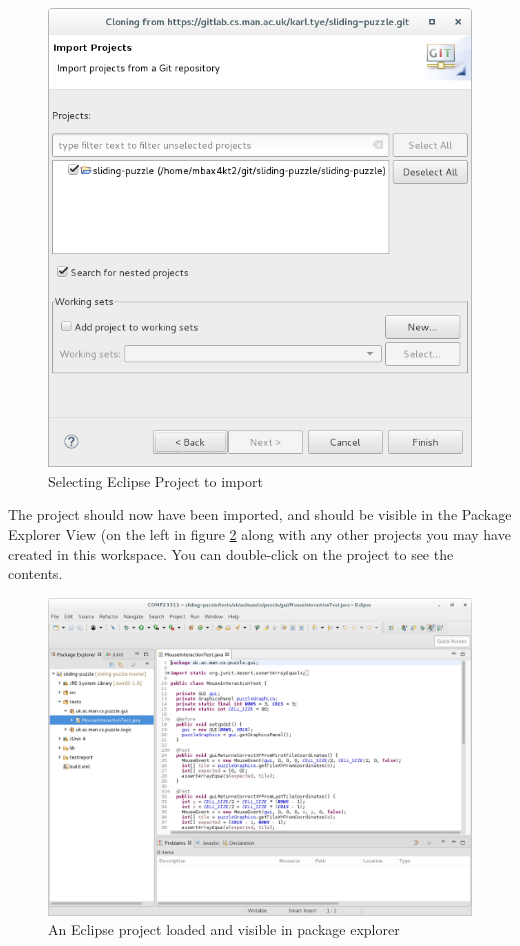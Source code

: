 \documentclass[
]{book}
\begin{document}
\begin{figure}

{\centering \includegraphics[width=0.8\linewidth]{images/selectEclipseProjectToImport} 

}

\caption{Selecting Eclipse Project to import}\label{fig:selectEclipseProjectToImport-fig}
\end{figure}

The project should now have been imported, and should be visible in the Package Explorer View (on the left in figure \ref{fig:eclipseProjectLoadedAndVisibleInPackageExplorer-fig} along with any other projects you may have created in this workspace. You can double-click on the project to see the contents.

\begin{figure}

{\centering \includegraphics[width=1\linewidth]{images/eclipseProjectLoadedAndVisibleInPackageExplorer} 

}

\caption{An Eclipse project loaded and visible in package explorer}\label{fig:eclipseProjectLoadedAndVisibleInPackageExplorer-fig}
\end{figure}
\end{document}
